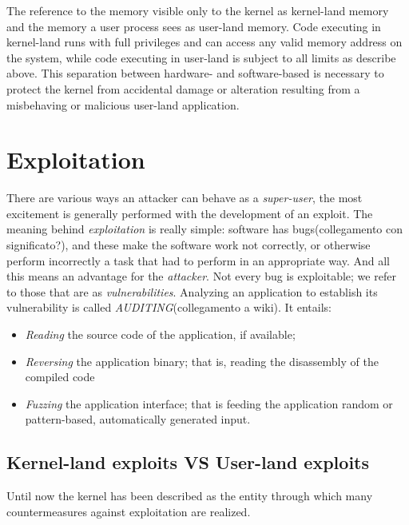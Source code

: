 \documentclass{masterthesis}
\begin{document}
The reference to the memory visible only to the kernel as kernel-land memory and the memory a user process sees as user-land memory.
Code executing in kernel-land runs with full privileges and can access any valid memory address on the system, while code executing in user-land is subject to all limits as describe above. This separation between hardware- and software-based is necessary to protect the kernel from accidental damage or alteration resulting from a misbehaving or malicious user-land application.

\chapter{Exploitation}
\label{ch:exploitation}

There are various ways an attacker can behave as a \emph{super-user}, the most excitement is generally performed with the development of an exploit.
The meaning behind \emph{exploitation} is really simple: software has bugs(collegamento con significato?), and these make the software work not correctly, or otherwise perform incorrectly a task that had to perform in an appropriate way. 
And all this means an advantage for the \emph{attacker}. Not every bug is exploitable; we refer to those that are as \emph{vulnerabilities}.
Analyzing an application to establish its vulnerability is called \emph{AUDITING}(collegamento a wiki). It entails: 
\begin{itemize}
\item \emph{Reading} the source code of the application, if available;
\item \emph{Reversing} the application binary; that is, reading the disassembly of the compiled code
\item \emph{Fuzzing} the application interface; that is feeding the application random or pattern-based, automatically generated input.
\end{itemize}

\section{Kernel-land exploits VS User-land exploits}
\label{sect:land}

Until now the kernel has been described as the entity through which many countermeasures against exploitation are realized.
\end{document}
